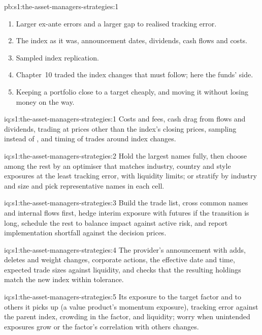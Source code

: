 \begin{solution}{pb:s1:the-asset-managers-strategies:1}
\begin{enumerate}
\item Larger ex-ante errors and a larger gap to realised tracking error.
\item The index as it was, announcement dates, dividends, cash flows and costs.
\item Sampled index replication.
\item Chapter~10 traded the index changes that  must follow; here the funds' side.
\item Keeping a portfolio close to a target cheaply, and moving it without losing money on the way.
\end{enumerate}
\end{solution}

\begin{solution}{iq:s1:the-asset-managers-strategies:1}
Costs and fees, cash drag from flows and dividends, trading at prices other than the index's closing prices, sampling instead of , and
timing of trades around index changes.
\end{solution}

\begin{solution}{iq:s1:the-asset-managers-strategies:2}
Hold the largest names fully, then choose among the rest by an optimiser that matches industry, country and style exposures at the least tracking error,
with liquidity limits; or stratify by industry and size and pick representative names in each cell.
\end{solution}

\begin{solution}{iq:s1:the-asset-managers-strategies:3}
Build the trade list, cross common names and internal flows first, hedge interim exposure with futures if the transition is long, schedule the rest to
balance impact against active risk, and report implementation shortfall against the decision prices.
\end{solution}

\begin{solution}{iq:s1:the-asset-managers-strategies:4}
The provider's announcement with adds, deletes and weight changes, corporate actions, the effective date and time, expected trade sizes against
liquidity, and checks that the resulting holdings match the new index within tolerance.
\end{solution}

\begin{solution}{iq:s1:the-asset-managers-strategies:5}
Its exposure to the target factor and to others it picks up (a value product's momentum exposure), tracking error against the parent index, crowding in
the factor, and liquidity; worry when unintended exposures grow or the factor's correlation with others changes.
\end{solution}

